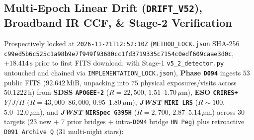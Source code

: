 \documentclass[twocolumn,10pt]{article}
\begin{document}
\subsection{Multi-Epoch Linear Drift (\texttt{DRIFT\_V52}), Broadband IR CCF, \& Stage-2 Verification}
Prospectively locked at \texttt{2026-11-21T12:52:10Z} (\texttt{METHOD\_LOCK.json} SHA-256 \texttt{c99ed5b6\allowbreak c525c1a9\allowbreak 8b9e7f94\allowbreak 9f93680c\allowbreak c1fd3719\allowbreak 335c7154\allowbreak c0edf609\allowbreak caae3d0c}, $+18.414\,\text{s}$ prior to first FITS download, with Stage-1 \texttt{v5\_2\_detector.py} untouched and chained via \texttt{IMPLEMENTATION\_LOCK.json}), \textbf{Phase \texttt{D094}} ingests $53$ public FITS ($92.642\,\text{MiB}$, unpacking into $75$ physical exposures/visits across $50.1222\,\text{h}$) from \textbf{SDSS \texttt{APOGEE-2}} ($R=22{,}500$, $1.51\text{--}1.70\,\mu\text{m}$), \textbf{ESO \texttt{CRIRES+}} $Y/J/H$ ($R=43{,}000\text{--}86{,}000$, $0.95\text{--}1.80\,\mu\text{m}$), \textbf{\textit{JWST} \texttt{MIRI LRS}} ($R\sim 100$, $5.0\text{--}12.0\,\mu\text{m}$), and \textbf{\textit{JWST} \texttt{NIRSpec G395H}} ($R=2{,}700$, $2.87\text{--}5.14\,\mu\text{m}$) across $30$ targets ($23$ new + $7$ prior bridges + intra-\texttt{D094} bridge \texttt{HN\,Peg}) plus retroactive \texttt{D091 Archive Q} ($31$ multi-night stars):
\end{document}

